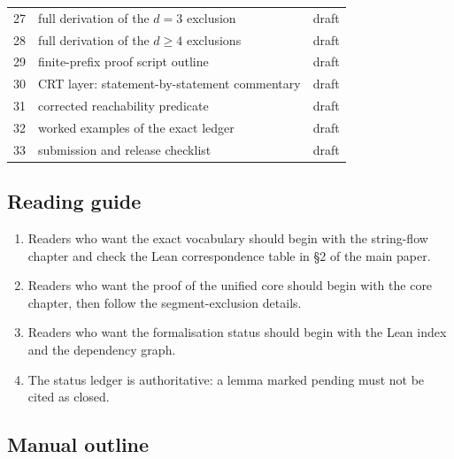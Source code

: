 \begin{center}
\begin{tabular}{@{}p{}p{}p{}@{}}
27 & full derivation of the $d=3$ exclusion & draft \\
28 & full derivation of the $d\ge4$ exclusions & draft \\
29 & finite-prefix proof script outline & draft \\
30 & CRT layer: statement-by-statement commentary & draft \\
31 & corrected reachability predicate & draft \\
32 & worked examples of the exact ledger & draft \\
33 & submission and release checklist & draft \\
\bottomrule
\end{tabular}
\end{center}

\subsection{Reading guide}

\begin{enumerate}[leftmargin=*]
\item Readers who want the exact vocabulary should begin with the
  string-flow chapter and check the Lean correspondence table in
  \S2 of the main paper.
\item Readers who want the proof of the unified core should begin with
  the core chapter, then follow the segment-exclusion details.
\item Readers who want the formalisation status should begin with the
  Lean index and the dependency graph.
\item The status ledger is authoritative: a lemma marked pending must
  not be cited as closed.
\end{enumerate}

\subsection{Manual outline}

